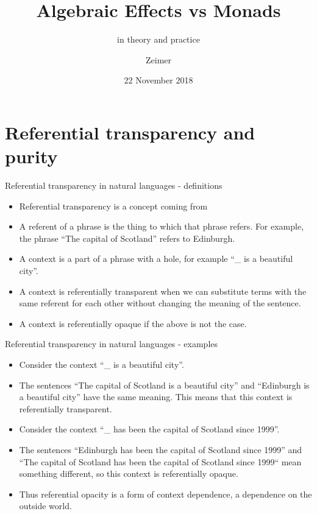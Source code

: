 \documentclass{beamer}
\title{Algebraic Effects vs Monads}
\subtitle{in theory and practice}
\author{Zeimer}
\date{22 November 2018}
\newcommand{\link}[2]{\href{#2}{\color{blue}{#1}}}
\begin{document}
\frame{\titlepage}

\frame{\tableofcontents}

\section{Referential transparency and purity}

\begin{frame}{Referential transparency in natural languages - definitions}
\begin{itemize}
	\item Referential transparency is a concept coming from \link{analytic philosophy}{https://en.wikipedia.org/wiki/Analytic_philosophy}
	\item A referent of a phrase is the thing to which that phrase refers. For example, the phrase ``The capital of Scotland'' refers to Edinburgh.
	\item A context is a part of a phrase with a hole, for example ``\_ is a beautiful city''.
	\item A context is referentially transparent when we can substitute terms with the same referent for each other without changing the meaning of the sentence.
	\item A context is referentially opaque if the above is not the case.
\end{itemize}
\end{frame}

\begin{frame}{Referential transparency in natural languages - examples}
\begin{itemize}
	\item Consider the context ``\_ is a beautiful city''.
	\item The sentences ``The capital of Scotland is a beautiful city'' and ``Edinburgh is a beautiful city'' have the same meaning. This means that this context is referentially transparent.
	\item Consider the context ``\_ has been the capital of Scotland since 1999''.
	\item The sentences ``Edinburgh has been the capital of Scotland since 1999'' and ``The capital of Scotland has been the capital of Scotland since 1999`` mean something different, so this context is referentially opaque.
	\item Thus referential opacity is a form of context dependence, a dependence on the outside world.
\end{itemize}
\end{frame}
\end{document}
